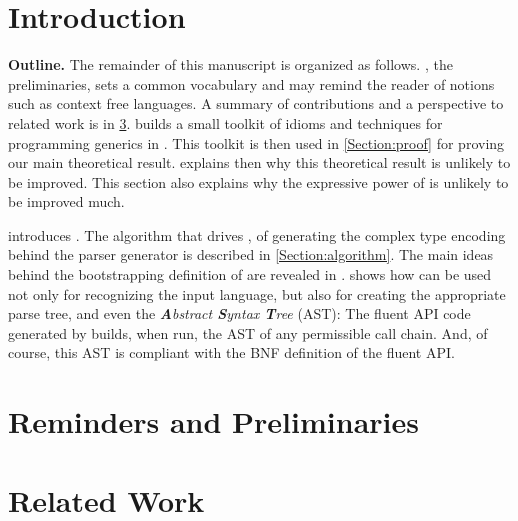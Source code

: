 \documentclass[a4paper,USenglish]{lipics}
\author{Anonymized for the submission}
\begin{document}
\maketitle
\begin{abstract}
  
\end{abstract}

\section{Introduction}


\textbf{Outline.}
The remainder of this manuscript is organized as follows.
, the preliminaries, sets a common vocabulary and may remind
  the reader of notions such as context free languages.
A summary of contributions and a perspective to related work is
  in \cref{Section:related}.
 builds a small toolkit of idioms and techniques
  for programming generics in \Java.
This toolkit is then used in \cref{Section:proof} for
  proving our main theoretical result.
 explains then why
  this theoretical result is unlikely to be improved.
This section also explains why the expressive power of \Self
  is unlikely to be improved much.

 introduces \Self.
The algorithm that drives \Self, of generating the complex
  type encoding behind the parser generator
  is described in \cref{Section:algorithm}.
The main ideas behind the bootstrapping definition of \Self
  are revealed in .
 shows how \Self can be used not only
  for recognizing the input language,
  but also for creating the appropriate parse tree, and even the \emph{\textbf Abstract \textbf Syntax \textbf Tree} (AST):
  The fluent API code generated by \Self builds,
    when run, the AST of any permissible call chain.
    And, of course, this AST is compliant with the BNF definition
      of the fluent API.

\section{Reminders and Preliminaries}
\label{Section:preliminaries}


\section{Related Work}
\label{Section:related}

\end{document}
